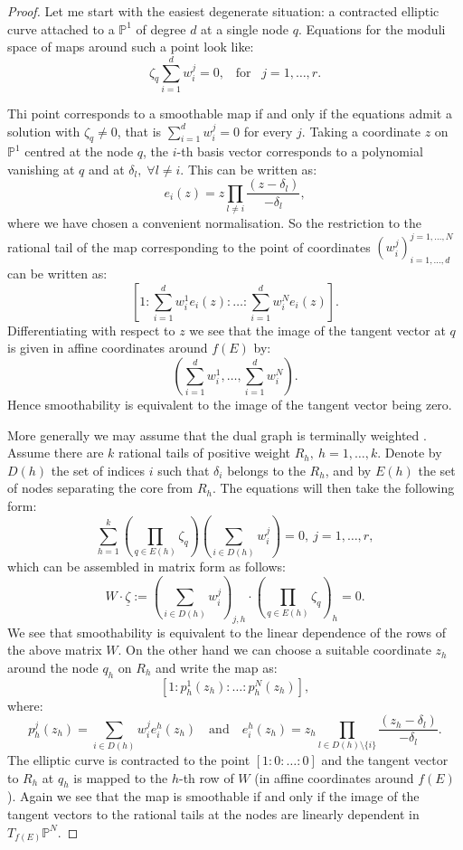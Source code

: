 \documentclass[11pt]{amsart}
\newcommand{\PP}{\mathbb P}
\theoremstyle{definition}
\theoremstyle{definition}
\begin{document}
\begin{proof}
 Let me start with the easiest degenerate situation: a contracted elliptic curve attached to a $\PP^1$ of degree $d$ at a single node $q$. Equations for the moduli space of maps around such a point look like: 
 \[\zeta_q\sum_{i=1}^d w_i^j=0,\;\;\;\text{for} \;\;\;j=1,\ldots,r.\]
 
 
  Thi point corresponds to a smoothable map if and only if the equations admit a solution with $\zeta_q\neq 0$, that is $\sum_{i=1}^d w_i^j=0$ for every $j$. Taking a coordinate $z$ on  $\PP^1$ centred at the node $q$,   the $i$-th basis vector corresponds to a polynomial vanishing at $q$ and at $\delta_l,\;\forall l\neq i$. This can be written as:
  \[e_i(z)=z\prod_{l\neq i}\frac{(z-\delta_l)}{-\delta_l},\] 
  where we have chosen a convenient normalisation. So the restriction to the rational tail of the map corresponding to the point of coordinates $(w_i^j)_{i=1,\ldots,d}^{j=1,\ldots,N}$ can be written as:
  \[[1:\sum_{i=1}^d w_i^1e_i(z):\ldots:\sum_{i=1}^d w_i^Ne_i(z)].\] 
  Differentiating with respect to $z$ we see that the image of the tangent vector at $q$ is given in affine coordinates around $f(E)$ by:
  \[(\sum_{i=1}^d w_i^1,\ldots,\sum_{i=1}^d w_i^N).\] 
  Hence smoothability is equivalent to the image of the tangent vector being zero.
 
 More generally we may assume that the dual graph is terminally weighted \cite[\S 3.1]{HL}. Assume there are $k$  rational tails of positive weight $R_h,\ h=1,\ldots,k$. Denote by $D(h)$ the set of indices $i$ such that $\delta_i$ belongs to the $R_h$, and by $E(h)$ the set of nodes separating the core from $R_h$. The equations will then take the following form:
 \[\sum_{h=1}^k\left(\prod_{q\in E(h)}\zeta_q\right)\left(\sum_{i\in D(h)}w_i^j\right)=0,\ j=1,\ldots,r,\]
 which can be assembled in matrix form as follows:
 $$W\cdot\underline\zeta:=\left(\sum_{i\in D(h)}w_i^j\right)_{j,h}\cdot\left(\prod_{q\in E(h)}\zeta_q\right)_h=0.$$
 We see that smoothability is equivalent to the linear dependence of the rows of the above matrix $W$. On the other hand we can choose a suitable coordinate $z_h$ around the node $q_h$ on $R_h$ and write the map as: 
 \[[1:p_h^1(z_h):\ldots:p_h^N(z_h)],\]
  where: 
 \[p_h^j(z_h)=\sum_{i\in D(h)}w_i^je_i^h(z_h) \quad \text{and} \quad e_i^h(z_h)=z_h\prod_{l\in D(h)\setminus\{i\}}\frac{(z_h-\delta_l)}{-\delta_l}.\] The elliptic curve is contracted to the point $[1:0:\ldots:0]$ and the tangent vector to $R_h$ at $q_h$ is mapped to the $h$-th row of $W$ (in affine coordinates around $f(E)$). Again we see that the map is smoothable if and only if the image of the tangent vectors to the rational tails at the nodes are linearly dependent in $T_{f(E)}\PP^N$.
 \end{proof}
\end{document}
